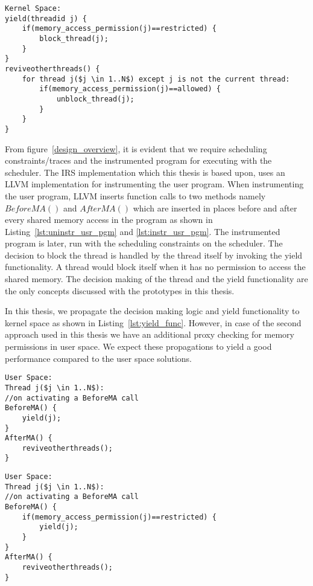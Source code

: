 \begin{lstlisting}[mathescape=true,style=customc,caption={Yield functionality and thread revival},frame=tlrb,label={lst:yield_func}]
Kernel Space:
yield(threadid j) {
	if(memory_access_permission(j)==restricted) {
		block_thread(j);
	}
}
reviveotherthreads() {
	for thread j($j \in 1..N$) except j is not the current thread:
		if(memory_access_permission(j)==allowed) {
			unblock_thread(j);
		}	
	}
}
\end{lstlisting}
From figure~\ref{design_overview}, it is evident that we require scheduling constraints/traces and the instrumented program for executing with the scheduler. 
The IRS implementation which this thesis is based upon, uses an LLVM implementation for instrumenting the user program. 
When instrumenting the user program, LLVM inserts function calls to two methods namely $BeforeMA()$ and $AfterMA()$ which are inserted in places before and after every shared memory access in the program as shown in Listing~\ref{lst:uninstr_usr_pgm} and \ref{lst:instr_usr_pgm}. 
The instrumented program is later, run with the scheduling constraints on the scheduler. 
The decision to block the thread is handled by the thread itself by invoking the yield functionality. 
A thread would block itself when it has no permission to access the shared memory. 
The decision making of the thread and the yield functionality are the only concepts discussed with the prototypes in this thesis. 

In this thesis, we propagate the decision making logic and yield functionality to kernel space as shown in Listing~\ref{lst:yield_func}. 
However, in case of the second approach used in this thesis we have an additional proxy checking for memory permissions in user space. 
We expect these propagations to yield a good performance compared to the user space solutions. 

\noindent\begin{minipage}{.45\textwidth}
\begin{lstlisting}[mathescape=true,style=customc,caption={First Approach},frame=tlrb,label={lst:first_approach}]
User Space:
Thread j($j \in 1..N$): 
//on activating a BeforeMA call
BeforeMA() {
	yield(j);
}
AfterMA() {
	reviveotherthreads();
}
\end{lstlisting}
\end{minipage}\hfill
\begin{minipage}{.45\textwidth}
\begin{lstlisting}[mathescape=true,style=customc,caption={Second Approach},frame=tlrb,label={lst:second_approach}]
User Space:
Thread j($j \in 1..N$): 
//on activating a BeforeMA call
BeforeMA() {
	if(memory_access_permission(j)==restricted) {
		yield(j);
	}
}
AfterMA() {
	reviveotherthreads();
}
\end{lstlisting}
\end{minipage}


